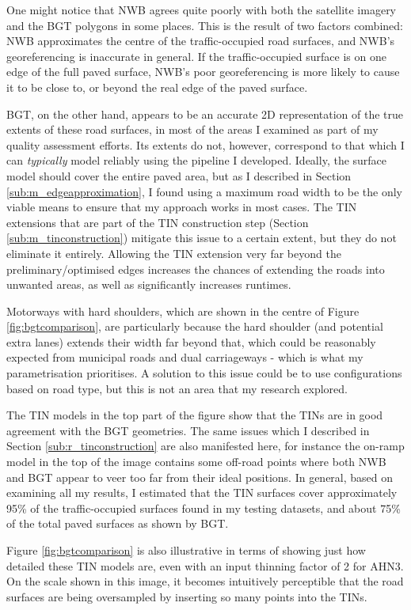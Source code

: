 One might notice that NWB agrees quite poorly with both the satellite imagery and the BGT polygons in some places. This is the result of two factors combined: NWB approximates the centre of the traffic-occupied road surfaces, and NWB's georeferencing is inaccurate in general. If the traffic-occupied surface is on one edge of the full paved surface, NWB's poor georeferencing is more likely to cause it to be close to, or beyond the real edge of the paved surface.

BGT, on the other hand, appears to be an accurate 2D representation of the true extents of these road surfaces, in most of the areas I examined as part of my quality assessment efforts. Its extents do not, however, correspond to that which I can \textit{typically} model reliably using the pipeline I developed. Ideally, the surface model should cover the entire paved area, but as I described in Section \ref{sub:m_edgeapproximation}, I found using a maximum road width to be the only viable means to ensure that my approach works in most cases. The TIN extensions that are part of the TIN construction step (Section \ref{sub:m_tinconstruction}) mitigate this issue to a certain extent, but they do not eliminate it entirely. Allowing the TIN extension very far beyond the preliminary/optimised edges increases the chances of extending the roads into unwanted areas, as well as significantly increases runtimes.

Motorways with hard shoulders, which are shown in the centre of Figure \ref{fig:bgtcomparison}, are particularly because the hard shoulder (and potential extra lanes) extends their width far beyond that, which could be reasonably expected from municipal roads and dual carriageways - which is what my parametrisation prioritises. A solution to this issue could be to use configurations based on road type, but this is not an area that my research explored.

The TIN models in the top part of the figure show that the TINs are in good agreement with the BGT geometries. The same issues which I described in Section \ref{sub:r_tinconstruction} are also manifested here, for instance the on-ramp model in the top of the image contains some off-road points where both NWB and BGT appear to veer too far from their ideal positions. In general, based on examining all my results, I estimated that the TIN surfaces cover approximately 95\% of the traffic-occupied surfaces found in my testing datasets, and about 75\% of the total paved surfaces as shown by BGT.

Figure \ref{fig:bgtcomparison} is also illustrative in terms of showing just how detailed these TIN models are, even with an input thinning factor of 2 for AHN3. On the scale shown in this image, it becomes intuitively perceptible that the road surfaces are being oversampled by inserting so many points into the TINs.

